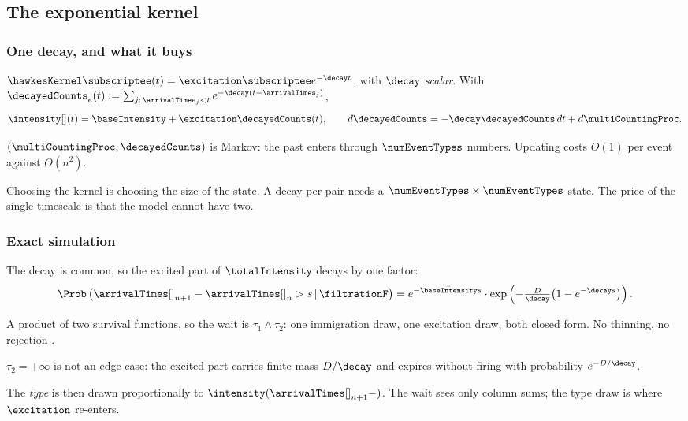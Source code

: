 \subsection{The exponential kernel}

\begin{frame}
  \frametitle{One decay, and what it buys}
$\hawkesKernel\subscriptee(t) = \excitation\subscriptee e^{-\decay t}$,
with $\decay$ \emph{scalar}.
With
$\decayedCounts_e(t) := \sum_{j:\, \arrivalTimes_{j} < t} e^{-\decay(t-\arrivalTimes_{j})}$,
\begin{equation*}
 \intensity[ ](t) = \baseIntensity + \excitation \decayedCounts(t),
 \qquad
 d\decayedCounts = -\decay \decayedCounts \, dt + d\multiCountingProc .
\end{equation*}

\pause

$(\multiCountingProc, \decayedCounts)$ is Markov: the past enters through $\numEventTypes$
numbers. Updating costs $O(1)$ per event against $O(n^2)$.

\pause

Choosing the kernel is choosing the size of the state.
A decay per pair needs a $\numEventTypes \times \numEventTypes$ state.
The price of the single timescale is that the model cannot have two.
\end{frame}

\begin{frame}
  \frametitle{Exact simulation}
The decay is common, so the excited part of $\totalIntensity$ decays by one factor:
\begin{equation*}
 \Prob \left( \arrivalTimes[]_{n+1} - \arrivalTimes[]_{n} > s \, \vert \, \filtrationF \right)
 = e^{-\bar{\baseIntensity}s} \cdot
 \exp\left( -\tfrac{D}{\decay}\big(1 - e^{-\decay s}\big) \right) .
\end{equation*}

\pause

A product of two survival functions, so the wait is $\tau_1 \wedge \tau_2$:
one immigration draw, one excitation draw, both closed form.
No thinning, no rejection \citep{DZ13exa}.

\pause

$\tau_2 = +\infty$ is not an edge case:
the excited part carries finite mass $D/\decay$ and expires without firing with probability
$e^{-D/\decay}$.

\pause

The \emph{type} is then drawn proportionally to $\intensity(\arrivalTimes[]_{n+1}-)$.
The wait sees only column sums; the type draw is where $\excitation$ re-enters.
\end{frame}

